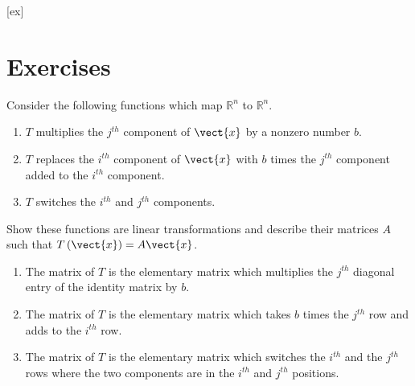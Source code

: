 [ex]
\section*{Exercises}

\begin{enumialphparenastyle}

\begin{ex} \label{exerlineartransf}
Consider the following functions which map $\mathbb{R}^{n}$ to $\mathbb{R}^{n}$. 

\begin{enumerate}
\item $T$ multiplies the $j^{th}$ component of $\vect{x}$ by a nonzero
number $b.$

\item $T$ replaces the $i^{th}$ component of $\vect{x}$ with $b$ times the
$j^{th}$ component added to the $i^{th}$ component.

\item $T$ switches the $i^{th}$ and $j^{th}$ components.
\end{enumerate}

Show these functions are linear transformations and describe their matrices $A$ such that $T\left(\vect{x}\right) = A\vect{x}$.
\begin{sol}
\begin{enumerate}
\item The matrix of $T$ is the elementary matrix which multiplies
the $j^{th}$ diagonal entry of the identity matrix by $b$.
\item The matrix of $T$ is the
elementary matrix which takes $b$ times the $j^{th}$ row and adds to the $%
i^{th}$ row.
\item The matrix of $T$ is the elementary matrix which switches the $%
i^{th}$ and the $j^{th}$ rows where the two components are in the $i^{th}$
and $j^{th}$ positions.
\end{enumerate}
\end{sol}
\end{ex}


\end{enumialphparenastyle}
